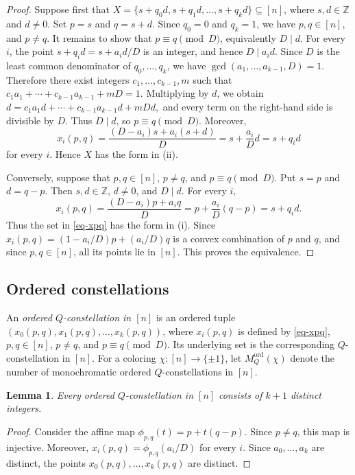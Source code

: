 \documentclass[twoside,12pt]{article}
\newcommand{\Z}{\mathbb{Z}}
\newcommand{\ord}{\mathrm{ord}}
\newcommand{\Mord}{M^{\ord}}
\newcommand{\1}{\mathbf 1}
\newtheorem{lemma}{Lemma}[section]
\begin{document}
\begin{proof}
Suppose first that
\(X=\{s+q_0d,s+q_1d,\dots,s+q_kd\}\subseteq[n]\), where
\(s,d\in\Z\) and \(d\ne0\).  Set \(p=s\) and \(q=s+d\).  Since \(q_0=0\)
and \(q_k=1\), we have \(p,q\in[n]\), and \(p\ne q\).  It remains to show
that \(p\equiv q\pmod D\), equivalently \(D\mid d\).  For every \(i\), the
point \(s+q_i d=s+a_i d/D\) is an integer, and hence \(D\mid a_i d\).  Since
\(D\) is the least common denominator of \(q_0,\dots,q_k\), we have
\(\gcd(a_1,\dots,a_{k-1},D)=1\).  Therefore there exist integers
\(c_1,\dots,c_{k-1},m\) such that
$c_1a_1+\cdots+c_{k-1}a_{k-1}+mD=1$.
Multiplying by \(d\), we obtain
$d=c_1a_1d+\cdots+c_{k-1}a_{k-1}d+mDd,$
and every term on the right-hand side is divisible by \(D\).  Thus
\(D\mid d\), so \(p\equiv q\pmod D\).  Moreover,
\[
 x_i(p,q)
 =
 \frac{(D-a_i)s+a_i(s+d)}{D}
 =
 s+\frac{a_i}{D}d
 =
 s+q_i d
\]
for every \(i\).  Hence \(X\) has the form in \textnormal{(ii)}.

Conversely, suppose that \(p,q\in[n]\), \(p\ne q\), and
\(p\equiv q\pmod D\).  Put \(s=p\) and \(d=q-p\).  Then \(s,d\in\Z\),
\(d\ne0\), and \(D\mid d\).  For every \(i\),
\[
 x_i(p,q)
 =
 \frac{(D-a_i)p+a_iq}{D}
 =
 p+\frac{a_i}{D}(q-p)
 =
 s+q_i d.
\]
Thus the set in \eqref{eq-xpq} has the form in \textnormal{(i)}.  Since
\(x_i(p,q)=(1-a_i/D)p+(a_i/D)q\) is a convex combination of \(p\) and \(q\),
and since \(p,q\in[n]\), all its points lie in \([n]\).  This proves the
equivalence.
\end{proof}


\subsection{Ordered constellations}

An \emph{ordered \(Q\)-constellation in \([n]\)} is an ordered tuple
\((x_0(p,q),x_1(p,q),\dots,x_k(p,q))\), where \(x_i(p,q)\) is defined by
\eqref{eq-xpq}, \(p,q\in[n]\), \(p\ne q\), and \(p\equiv q\pmod D\).  Its
underlying set is the corresponding \(Q\)-constellation in \([n]\).  For a
coloring \(\chi:[n]\to\{\pm1\}\), let \(\Mord_Q(\chi)\) denote the number of
monochromatic ordered \(Q\)-constellations in \([n]\).

\begin{lemma}\label{lem:distinct}
Every ordered \(Q\)-constellation in \([n]\) consists of \(k+1\) distinct
integers.
\end{lemma}

\begin{proof}
Consider the affine map \(\phi_{p,q}(t)=p+t(q-p)\).  Since \(p\ne q\), this
map is injective.  Moreover, \(x_i(p,q)=\phi_{p,q}(a_i/D)\) for every \(i\).
Since \(a_0,\dots,a_k\) are distinct, the points
\(x_0(p,q),\dots,x_k(p,q)\) are distinct.
\end{proof}
\end{document}

